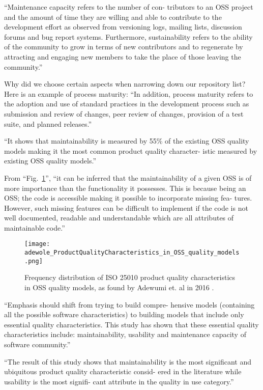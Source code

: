 \documentclass[12pt,letterpaper]{report}
\begin{document}
``Maintenance capacity refers to the number of con- tributors to an OSS project and the amount of time they are willing and able to contribute to the development effort as observed from versioning logs, mailing lists, discussion forums and bug report systems. Furthermore, sustainability refers to the ability of the community to grow in terms of new contributors and to regenerate by attracting and engaging new members to take the place of those leaving the community.'' \cite{adewumi:2016}

Why did we choose certain aspects when narrowing down our repository list? Here is an example of process maturity: ``In addition, process maturity refers to the adoption and use of standard practices in the development process such as submission and review of changes, peer review of changes, provision of a test suite, and planned releases.'' \cite{adewumi:2016}

``It shows that maintainability is measured by 55\% of the existing OSS quality models making it the most common product quality character- istic measured by existing OSS quality models.'' \cite{adewumi:2016}

From ``Fig.~\ref{figFreqDistProductQualityModel}'', ``it can be inferred that the maintainability of a given OSS is of more importance than the functionality it possesses. This is because being an OSS; the code is accessible making it possible to incorporate missing fea- tures. However, such missing features can be difficult to implement if the code is not well documented, readable and understandable which are all attributes of maintainable code.'' \cite{adewumi:2016}

\begin{figure}[ht]
  \centerline{
      \texttt{[image: adewole\_ProductQualityCharacteristics\_in\_OSS\_quality\_models.png]}
  }
  \caption{Frequency distribution of ISO 25010 product quality characteristics in OSS quality models, as found by Adewumi et. al in 2016 \cite{adewumi:2016}.}
  \label{figFreqDistProductQualityModel}
\end{figure}

``Emphasis should shift from trying to build compre- hensive models (containing all the possible software characteristics) to building models that include only essential quality characteristics. This study has shown that these essential quality characteristics include: maintainability, usability and maintenance capacity of software community.'' \cite{adewumi:2016}

``The result of this study shows that maintainability is the most significant and ubiquitous product quality characteristic consid- ered in the literature while usability is the most signifi- cant attribute in the quality in use category.'' \cite{adewumi:2016}
\end{document}
